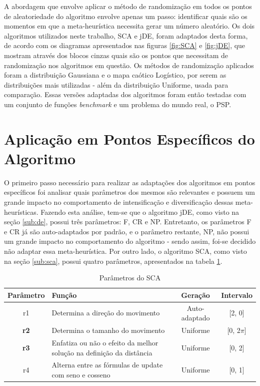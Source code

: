A abordagem que envolve aplicar o método de randomização em todos os pontos de aleatoriedade do algoritmo envolve apenas um passo: identificar quais são os momentos em que a meta-heurística necessita gerar um número aleatório. Os dois algoritmos utilizados neste trabalho, SCA e jDE, foram adaptados desta forma, de acordo com os diagramas apresentados nas figuras \ref{fig:SCA} e \ref{fig:jDE}, que mostram através dos blocos cinzas quais são os pontos que necessitam de randomização nos algoritmos em questão. Os métodos de randomização aplicados foram a distribuição Gaussiana e o mapa caótico Logístico, por serem as distribuições mais utilizadas - além da distribuição Uniforme, usada para comparação. Essas versões adaptadas dos algoritmos foram então testadas com um conjunto de funções \textit{benchmark} e um problema do mundo real, o PSP.

\section{Aplicação em Pontos Específicos do Algoritmo}
\label{sec:apPontosEsp}

O primeiro passo necessário para realizar as adaptações dos algoritmos em pontos específicos foi analisar quais parâmetros dos mesmos são relevantes e possuem um grande impacto no comportamento de intensificação e diversificação dessas meta-heurísticas. Fazendo esta análise, tem-se que o algoritmo jDE, como visto na seção \ref{sub:de}, possui três parâmetros: F, CR e NP. Entretanto, os parâmetros F e CR já são auto-adaptados por padrão, e o parâmetro restante, NP, não possui um grande impacto no comportamento do algoritmo - sendo assim, foi-se decidido não adaptar essa meta-heurística. Por outro lado, o algoritmo SCA, como visto na seção \ref{sub:sca}, possui quatro parâmetros, apresentados na tabela \ref{tab:parametros}.

\begin{table}[!htpb]
    \centering
    \begin{tabularx}{\textwidth}{c|X|c|c} %
    
      \textbf{Parâmetro} & \textbf{Função} &  \textbf{Geração} & \textbf{Intervalo} \\
      \hline
      r1 & Determina a direção do movimento & Auto-adaptado & [2, 0]\\
      \hline
      \bf{r2} & Determina o tamanho do movimento & Uniforme & [0, 2$\pi$] \\
      \hline
      \bf{r3} & Enfatiza ou não o efeito da melhor solução na definição da distância & Uniforme & [0, 2] \\
      \hline
      r4 & Alterna entre as fórmulas de update com seno e cosseno & Uniforme & [0, 1] \\
    \end{tabularx}
    \caption{Parâmetros do SCA}
    \label{tab:parametros}
\end{table}

